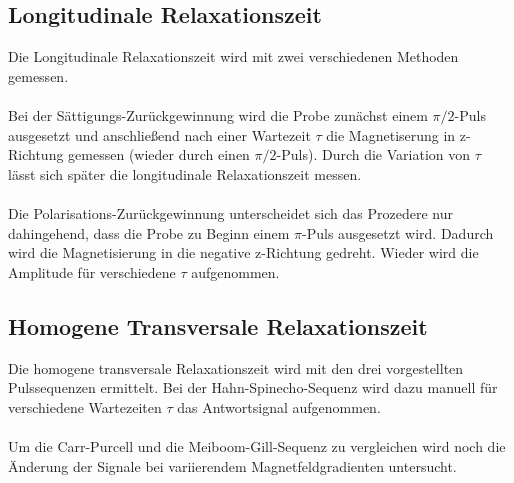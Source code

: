 \subsection{Longitudinale Relaxationszeit}
Die Longitudinale Relaxationszeit wird mit zwei verschiedenen Methoden gemessen. \\ \\
Bei der Sättigungs-Zurückgewinnung wird die Probe zunächst einem $\pi/2$-Puls ausgesetzt und anschließend nach einer Wartezeit $\tau$ die Magnetiserung in z-Richtung gemessen (wieder durch einen $\pi/2$-Puls). Durch die Variation von $\tau$ lässt sich später die longitudinale Relaxationszeit messen. \\ \\
Die Polarisations-Zurückgewinnung unterscheidet sich das Prozedere nur dahingehend, dass die Probe zu Beginn einem $\pi$-Puls ausgesetzt wird. Dadurch wird die Magnetisierung in die negative z-Richtung gedreht. Wieder wird die Amplitude für verschiedene $\tau$ aufgenommen.

\subsection{Homogene Transversale Relaxationszeit}
Die homogene transversale Relaxationszeit wird mit den drei vorgestellten Pulssequenzen ermittelt. Bei der Hahn-Spinecho-Sequenz wird dazu manuell für verschiedene Wartezeiten $\tau$ das Antwortsignal aufgenommen. \\ \\
Um die Carr-Purcell und die Meiboom-Gill-Sequenz zu vergleichen wird noch die Änderung der Signale bei variierendem Magnetfeldgradienten untersucht.   

